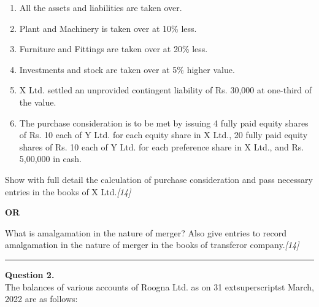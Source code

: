 \documentclass[11pt,a4paper]{article}
\newcommand{\pts}[1]{\hfill   \textit{[#1]}}
\begin{document}
\begin{enumerate}[label=(\arabic*),leftmargin=*]
  \item All the assets and liabilities are taken over.
  \item Plant and Machinery is taken over at 10\% less.
  \item Furniture and Fittings are taken over at 20\% less.
  \item Investments and stock are taken over at 5\% higher value.
  \item X Ltd. settled an unprovided contingent liability of Rs. 30,000 at one-third of the value.
  \item The purchase consideration is to be met by issuing 4 fully paid equity shares of Rs. 10 each of Y Ltd. for each equity share in X Ltd., 20 fully paid equity shares of Rs. 10 each of Y Ltd. for each preference share in X Ltd., and Rs. 5,00,000 in cash.
\end{enumerate}
Show with full detail the calculation of purchase consideration and pass necessary entries in the books of X Ltd.\pts{14}

\centerline{   \textbf{OR}}




\noindent What is amalgamation in the nature of merger? Also give entries to record amalgamation in the nature of merger in the books of transferor company.\pts{14}

\medskip\rule{\linewidth}{0.2pt}




\noindent   \textbf{Question 2.} \\
The balances of various accounts of Roogna Ltd. as on 31 extsuperscript{st} March, 2022 are as follows:
\end{document}
